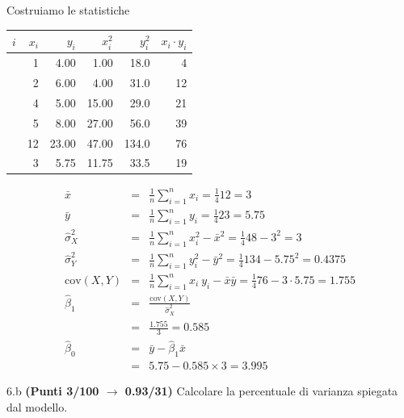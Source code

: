 \documentclass[
  11pt,
]{book}
\theoremstyle{mytheoremstyle}
\theoremstyle{mydefstyle}
\newenvironment{sol}
  {
  \begin{tcolorbox}[enhanced,breakable,arc=0.1mm,boxrule=1pt,colback=white,colframe=iblue,
  title=\bf \fontfamily{lmss}\selectfont \hspace{.5 cm} Soluzione,drop fuzzy shadow]

}{
\end{tcolorbox}
  }
\begin{document}
\begin{sol}

Costruiamo le statistiche

\begin{table}[H]
\centering
\begin{tabular}{>{\raggedright\arraybackslash}p{3em}rrrrr}
\toprule
$i$ & $x_i$ & $y_i$ & $x_i^2$ & $y_i^2$ & $x_i\cdot y_i$\\
\midrule
\cellcolor[HTML]{E6E6E6}{1} & 1 & 4.00 & 1.00 & 18.0 & 4\\
\cellcolor[HTML]{E6E6E6}{2} & 2 & 6.00 & 4.00 & 31.0 & 12\\
\cellcolor[HTML]{E6E6E6}{3} & 4 & 5.00 & 15.00 & 29.0 & 21\\
\cellcolor[HTML]{E6E6E6}{4} & 5 & 8.00 & 27.00 & 56.0 & 39\\
\cellcolor[HTML]{E6E6E6}{Totale} & 12 & 23.00 & 47.00 & 134.0 & 76\\
\cellcolor[HTML]{E6E6E6}{Totale/n} & 3 & 5.75 & 11.75 & 33.5 & 19\\
\bottomrule
\end{tabular}
\end{table}

\begin{eqnarray*}
           \bar x &=&\frac 1 n\sum_{i=1}^n x_i = \frac {1}{ 4 }  12 =  3 \\
           \bar y &=&\frac 1 n\sum_{i=1}^n y_i = \frac {1}{ 4 }  23 =  5.75 \\
           \hat\sigma_X^2&=&\frac 1 n\sum_{i=1}^n x_i^2-\bar x^2=\frac {1}{ 4 }  48  - 3 ^2= 3 \\
           \hat\sigma_Y^2&=&\frac 1 n\sum_{i=1}^n y_i^2-\bar y^2=\frac {1}{ 4 }  134  - 5.75 ^2= 0.4375 \\
           \text{cov}(X,Y)&=&\frac 1 n\sum_{i=1}^n x_i~y_i-\bar x\bar y=\frac {1}{ 4 }  76 - 3 \cdot 5.75 = 1.755 \\
           \hat\beta_1 &=& \frac{\text{cov}(X,Y)}{\hat\sigma_X^2} \\
                    &=& \frac{ 1.755 }{ 3 }  =  0.585 \\
           \hat\beta_0 &=& \bar y - \hat\beta_1 \bar x\\
                    &=&  5.75 - 0.585 \times  3 = 3.995 
         \end{eqnarray*}

\end{sol}

6.b \textbf{(Punti 3/100 \(\rightarrow\) 0.93/31)} Calcolare la percentuale di varianza spiegata dal modello.
\end{document}
